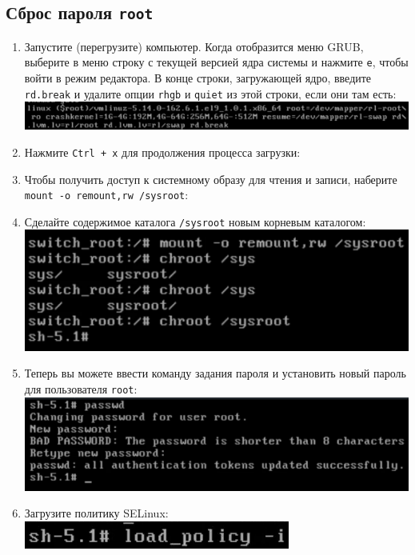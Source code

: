 \documentclass[12pt]{article}
\begin{document}
\subsection{Сброс пароля \texttt{root}}
\begin{enumerate}
	\item Запустите (перегрузите) компьютер. Когда отобразится меню GRUB, выберите в меню строку с текущей версией ядра системы и нажмите \texttt{e}, чтобы войти в режим редактора.
	      В конце строки, загружающей ядро, введите \texttt{rd.break} и удалите опции \texttt{rhgb} и \texttt{quiet} из этой строки, если они там есть:
	      \\\includegraphics{10.png}
	\item Нажмите \texttt{Ctrl + x} для продолжения процесса загрузки:
	\item Чтобы получить доступ к системному образу для чтения и записи, наберите \texttt{mount -o remount,rw /sysroot}:
	\item Сделайте содержимое каталога \texttt{/sysroot} новым корневым каталогом:
	      \\\includegraphics{11.png}
	\item Теперь вы можете ввести команду задания пароля и установить новый пароль для пользователя \texttt{root}:
	      \\\includegraphics{12.png}
	\item Загрузите политику SELinux:
	      \\\includegraphics{13.png}

\end{enumerate}
\end{document}
